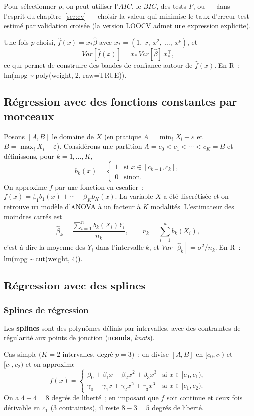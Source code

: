 \documentclass[11pt,letterpaper]{article}
\begin{document}
Pour sélectionner $p$, on peut utiliser l'$AIC$, le $BIC$, des tests $F$, ou --- dans l'esprit du chapitre~\ref{sec:cv} --- choisir la valeur qui minimise le taux d'erreur test estimé par validation croisée (la version LOOCV admet une expression explicite).

Une fois $p$ choisi, $\hat f(x) = x_*\hat\beta$ avec $x_* = (1,\ x,\ x^2,\ \ldots,\ x^p)$, et
$$Var[\hat f(x)] = x_*\, Var[\hat\beta]\, x_*^\top,$$
ce qui permet de construire des bandes de confiance autour de $\hat f(x)$. En \textrm{R}~: \textsf{lm(mpg \textasciitilde{} poly(weight, 2, raw=TRUE))}.

\subsection{Régression avec des fonctions constantes par morceaux}

Posons $[A,B]$ le domaine de $X$ (en pratique $A = \min_i X_i - \varepsilon$ et $B = \max_i X_i + \varepsilon$). Considérons une partition $A = c_0 < c_1 < \cdots < c_K = B$ et définissons, pour $k = 1,\ldots,K$,
$$b_k(x) = \begin{cases} 1 & \mbox{si } x\in[c_{k-1},c_k],\\ 0 & \mbox{sinon}.\end{cases}$$
On approxime $f$ par une fonction en escalier~: $f(x) = \beta_1 b_1(x) + \cdots + \beta_K b_K(x)$. La variable $X$ a été discrétisée et on retrouve un modèle d'ANOVA à un facteur à $K$ modalités. L'estimateur des moindres carrés est
$$\hat\beta_k = \frac{\sum_{i=1}^n b_k(X_i)Y_i}{n_k}, \qquad n_k = \sum_{i=1}^n b_k(X_i),$$
c'est-à-dire la moyenne des $Y_i$ dans l'intervalle $k$, et $Var[\hat\beta_k] = \sigma^2/n_k$. En \textrm{R}~: \textsf{lm(mpg \textasciitilde{} cut(weight, 4))}.

\subsection{Régression avec des splines}

\subsubsection{Splines de régression}

Les \textbf{splines} sont des polynômes définis par intervalles, avec des contraintes de régularité aux points de jonction (\textbf{n\oe uds}, \textit{knots}).

Cas simple ($K=2$ intervalles, degré $p=3$)~: on divise $[A,B]$ en $[c_0,c_1)$ et $[c_1,c_2)$ et on approxime
$$f(x) = \begin{cases}\beta_0 + \beta_1 x + \beta_2 x^2 + \beta_3 x^3 & \mbox{si } x\in[c_0,c_1),\\ \gamma_0 + \gamma_1 x + \gamma_2 x^2 + \gamma_3 x^3 & \mbox{si } x\in[c_1,c_2).\end{cases}$$
On a $4+4 = 8$ degrés de liberté~; en imposant que $f$ soit continue et deux fois dérivable en $c_1$ (3 contraintes), il reste $8-3 = 5$ degrés de liberté.
\end{document}
